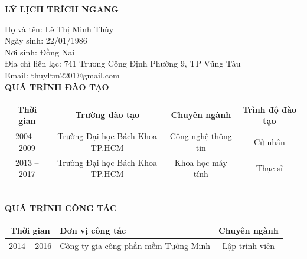 \documentclass[a4paper, 13pt]{report}
\begin{document}
\clearpage
\newpage
\begin{center}{\fontsize{16pt}{1}\selectfont \textbf{LÝ LỊCH TRÍCH NGANG}}\\\end{center}
\vspace*{0.1cm}Họ và tên: Lê Thị Minh Thùy \\
\vspace*{0.1cm}Ngày sinh: 22/01/1986 \\
\vspace*{0.1cm}Nơi sinh: Đồng Nai \\
\vspace*{0.1cm}Địa chỉ liên lạc: 741 Trương Công Định Phường 9, TP Vũng Tàu \\
\vspace*{0.1cm}Email: thuyltm2201@gmail.com \\
\vspace*{0.1cm}\textbf{QUÁ TRÌNH ĐÀO TẠO}\\
\vspace*{0.5cm}\begin{tabular}{ |c|c|c|c| } 
\hline
 Thời gian & Trường đào tạo & Chuyên ngành & Trình độ đào tạo\\
\hline
 2004 – 2009 & Trường Đại học Bách Khoa TP.HCM & Công nghệ thông tin & Cử nhân\\
\hline 
 2013 – 2017 & Trường Đại học Bách Khoa TP.HCM & Khoa học máy tính & Thạc sĩ\\
\hline
\end{tabular}\\
\vspace*{0.5cm}\textbf{QUÁ TRÌNH CÔNG TÁC}\\
\vspace*{0.5cm}\begin{tabular}{ |c|p{9.8cm}|c| } 
\hline
 Thời gian & Đơn vị công tác & Chuyên ngành\\
\hline
 2014 – 2016 & Công ty gia công phần mềm Tường Minh & Lập trình viên\\
\hline 
\end{tabular}
\end{document}
